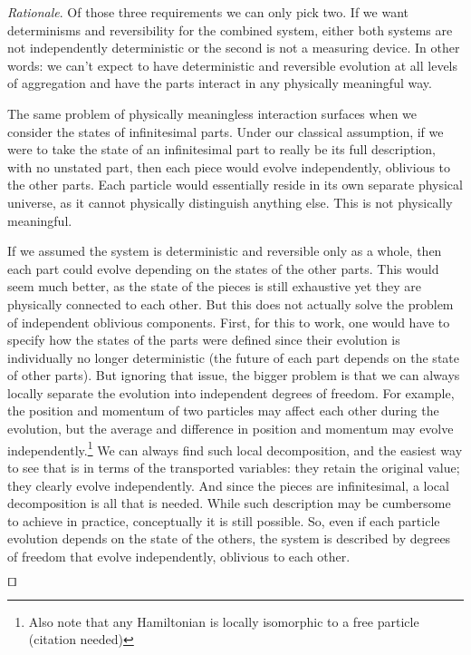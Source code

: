 \documentclass[smallextended]{svjour3}
\numberwithin{equation}{section}
\newenvironment{rationale}{\emph{Rationale}.}{\hfill\(\qed\)}
\begin{document}
\begin{rationale}
	Of those three requirements we can only pick two. If we want determinisms and reversibility for the combined system, either both systems are not independently deterministic or the second is not a measuring device. In other words: we can't expect to have deterministic and reversible evolution at all levels of aggregation and have the parts interact in any physically meaningful way.
	
	The same problem of physically meaningless interaction surfaces when we consider the states of infinitesimal parts. Under our classical assumption, if we were to take the state of an infinitesimal part to really be its full description, with no unstated part, then each piece would evolve independently, oblivious to the other parts. Each particle would essentially reside in its own separate physical universe, as it cannot physically distinguish anything else. This is not physically meaningful.
	
	If we assumed the system is deterministic and reversible only as a whole, then each part could evolve depending on the states of the other parts. This would seem much better, as the state of the pieces is still exhaustive yet they are physically connected to each other. But this does not actually solve the problem of independent oblivious components. First, for this to work, one would have to specify how the states of the parts were defined since their evolution is individually no longer deterministic (the future of each part depends on the state of other parts). But ignoring that issue, the bigger problem is that we can always locally separate the evolution into independent degrees of freedom. For example, the position and momentum of two particles may affect each other during the evolution, but the average and difference in position and momentum may evolve independently.\footnote{Also note that any Hamiltonian is locally isomorphic to a free particle (citation needed)} We can always find such local decomposition, and the easiest way to see that is in terms of the transported variables: they retain the original value; they clearly evolve independently. And since the pieces are infinitesimal, a local decomposition is all that is needed. While such description may be cumbersome to achieve in practice, conceptually it is still possible. So, even if each particle evolution depends on the state of the others, the system is described by degrees of freedom that evolve independently, oblivious to each other.	
	

\end{rationale}
\end{document}
